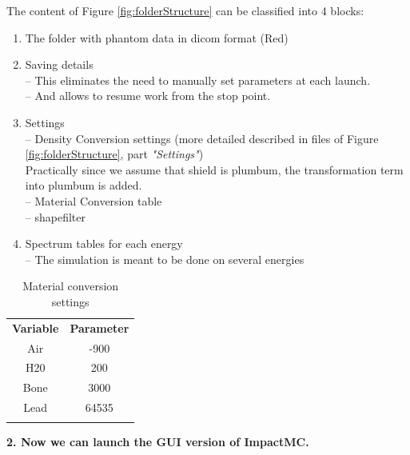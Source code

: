\documentclass[fleqn,10pt]{SelfArx} %
\begin{document}
The content of Figure \ref{fig:folderStructure} can be classified into 4 blocks:
\begin{enumerate}
\item The folder with phantom data in dicom format (Red)
\item Saving details\\
-- This eliminates the need to manually set parameters at each launch.\\
-- And allows to resume work from the stop point.
\item Settings\\
-- Density Conversion settings (more detailed described in files of Figure \ref{fig:folderStructure}, part \textit{"Settings"})\\ 
Practically since we assume that shield is plumbum, the transformation term into plumbum is added.\\
-- Material Conversion table\\
-- shapefilter\\
\item Spectrum tables for each energy\\
-- The simulation is meant to be done on several energies

\end{enumerate}


\begin{table}[!hbt]
\caption{Material conversion settings}
\centering

   \label{tab:label}
   \begin{tabulary}{\linewidth}[hbt]{||c|c||}
   \textbf{Variable} & \textbf{Parameter}\\
  \hhline{|:=|=:|}
    Air &  -900\\
	\hhline{||--||}
   H20 & 200\\
	\hhline{||--||}
  Bone & 3000\\
	\hhline{||--||}
  Lead & 64535\\
  \end{tabulary}
\end{table}


\textbf{2. Now we can launch the GUI version of ImpactMC. }
\end{document}
